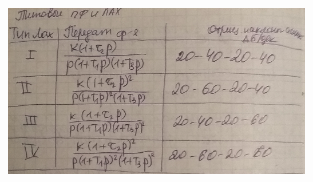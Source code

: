     
    

\begin{figure}
    \centering
    \includegraphics[width=0.7\textwidth]{images/pf.png}
\end{figure}